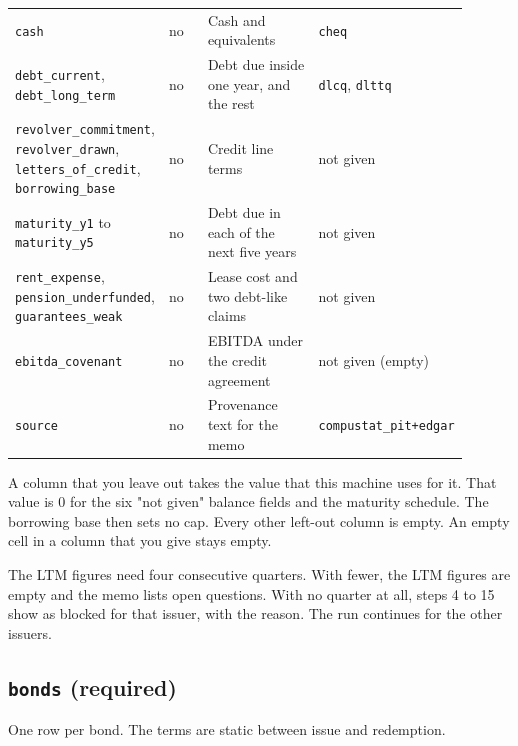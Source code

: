 \documentclass[10.5pt,a4paper]{article}
\newcommand{\code}[1]{\texttt{\small #1}}
\begin{document}
\begin{longtable}{@{}>{\raggedright\arraybackslash}p{0.180\linewidth}>{\raggedright\arraybackslash}p{0.135\linewidth}>{\raggedright\arraybackslash}p{0.360\linewidth}>{\raggedright\arraybackslash}p{0.225\linewidth}@{}}
\code{cash} & no & Cash and equivalents & \code{cheq}\\
\code{debt\_\allowbreak{}current}, \code{debt\_\allowbreak{}long\_\allowbreak{}term} & no & Debt due inside one year, and the rest & \code{dlcq}, \code{dlttq}\\
\code{revolver\_\allowbreak{}commitment}, \code{revolver\_\allowbreak{}drawn}, \code{letters\_\allowbreak{}of\_\allowbreak{}credit}, \code{borrowing\_\allowbreak{}base} & no & Credit line terms & not given\\
\code{maturity\_\allowbreak{}y1} to \code{maturity\_\allowbreak{}y5} & no & Debt due in each of the next five years & not given\\
\code{rent\_\allowbreak{}expense}, \code{pension\_\allowbreak{}underfunded}, \code{guarantees\_\allowbreak{}weak} & no & Lease cost and two debt-like claims & not given\\
\code{ebitda\_\allowbreak{}covenant} & no & EBITDA under the credit agreement & not given (empty)\\
\code{source} & no & Provenance text for the memo & \code{compustat\_\allowbreak{}pit+edgar}\\
\bottomrule
\end{longtable}

A column that you leave out takes the value that this machine uses for it. That value is 0 for the six "not given" balance fields and the maturity schedule. The borrowing base then sets no cap. Every other left-out column is empty. An empty cell in a column that you give stays empty.

The LTM figures need four consecutive quarters. With fewer, the LTM figures are empty and the memo lists open questions. With no quarter at all, steps 4 to 15 show as blocked for that issuer, with the reason. The run continues for the other issuers.

\subsection{\code{bonds} (required)}

One row per bond. The terms are static between issue and redemption.
\end{document}
